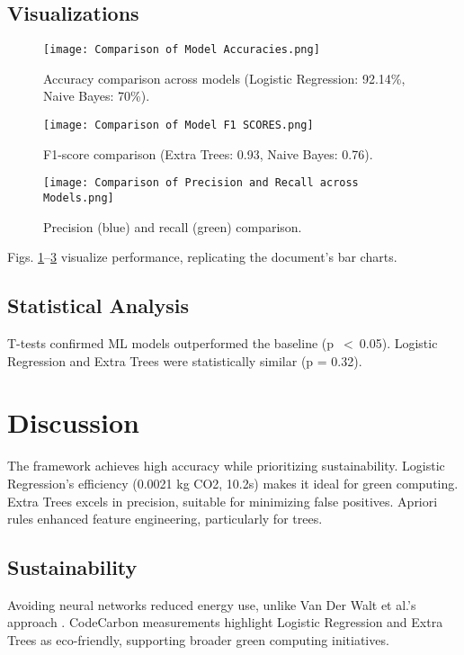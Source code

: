 \documentclass[conference]{IEEEtran}
\begin{document}
\subsection{Visualizations}
\begin{figure}[htbp]
\centerline{\texttt{[image: Comparison of Model Accuracies.png]}}
\caption{Accuracy comparison across models (Logistic Regression: 92.14\%, Naive Bayes: 70\%).}
\label{fig:acc}
\end{figure}

\begin{figure}[htbp]
\centerline{\texttt{[image: Comparison of Model F1 SCORES.png]}}
\caption{F1-score comparison (Extra Trees: 0.93, Naive Bayes: 0.76).}
\label{fig:f1}
\end{figure}

\begin{figure}[htbp]
\centerline{\texttt{[image: Comparison of Precision and Recall across Models.png]}}
\caption{Precision (blue) and recall (green) comparison.}
\label{fig:pr}
\end{figure}

Figs. \ref{fig:acc}--\ref{fig:pr} visualize performance, replicating the document’s bar charts.

\subsection{Statistical Analysis}
T-tests confirmed ML models outperformed the baseline (p~$<~$0.05). Logistic Regression and Extra Trees were statistically similar (p = 0.32).

\section{Discussion}
\label{sec:discuss}
The framework achieves high accuracy while prioritizing sustainability. Logistic Regression’s efficiency (0.0021 kg CO2, 10.2s) makes it ideal for green computing. Extra Trees excels in precision, suitable for minimizing false positives. Apriori rules enhanced feature engineering, particularly for trees.

\subsection{Sustainability}
Avoiding neural networks reduced energy use, unlike Van Der Walt et al.’s approach \cite{b6}. CodeCarbon measurements highlight Logistic Regression and Extra Trees as eco-friendly, supporting broader green computing initiatives.
\end{document}
